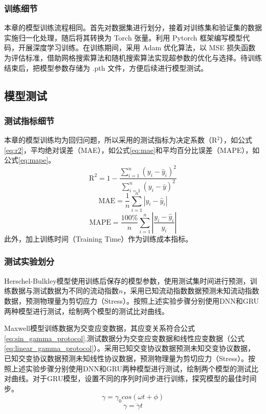 \subsubsection{训练细节}
本章的模型训练流程相同。首先对数据集进行划分，接着对训练集和验证集的数据实施归一化处理，随后将其转换为 Torch 张量。利用 Pytorch 框架编写模型代码，开展深度学习训练。在训练期间，采用 Adam 优化算法，以 MSE 损失函数为评估标准，借助网格搜索算法和随机搜索算法实现超参数的优化与选择。待训练结束后，把模型参数存储为 .pth 文件，方便后续进行模型测试。

\subsection{模型测试}
\subsubsection{测试指标细节}
本章的模型训练均为回归问题，所以采用的测试指标为决定系数（R$^2$），如公式\eqref{eq:r2}，平均绝对误差（MAE），如公式\eqref{eq:mae}和平均百分比误差（MAPE），如公式\eqref{eq:mape}。
\begin{equation}
  \text{R}^2 = 1 - \frac{\sum_{i=1}^{n} (y_i - \hat{y}_i)^2}{\sum_{i=1}^{n} (y_i - \bar{y})^2} \label{eq:r2}
\end{equation}
\begin{equation}
  \text{MAE} = \frac{1}{n} \sum_{i=1}^{n} |y_i - \hat{y}_i| \label{eq:mae}
\end{equation}
\begin{equation}
  \text{MAPE} = \frac{100\%}{n} \sum_{i=1}^{n} \left| \frac{y_i - \hat{y}_i}{y_i} \right| \label{eq:mape}
\end{equation}
此外，加上训练时间（Training Time）作为训练成本指标。

\subsubsection{测试实验划分}
Herschel-Bulkley模型使用训练后保存的模型参数，使用测试集时间进行预测，训练数据与测试数据为不同的流动指数$n$，采用已知流动指数数据预测未知流动指数数据，预测物理量为剪切应力（Stress）。按照上述实验步骤分别使用DNN和GRU两种模型进行测试，绘制两个模型的测试比对曲线。

Maxwell模型训练数据为交变应变数据，其应变关系符合公式\eqref{eq:sin_gamma_protocol},测试数据分为交变应变数据和线性应变数据（公式\eqref{eq:linear_gamma_protocol}）。采用已知交变协议数据预测未知交变协议数据，已知交变协议数据预测未知线性协议数据，预测物理量为剪切应力（Stress）。按照上述实验步骤分别使用DNN和GRU两种模型进行测试，绘制两个模型的测试比对曲线。对于GRU模型，设置不同的序列时间步进行训练，探究模型的最佳时间步。
\begin{equation}
  \gamma=\gamma_0cos(\omega t+\phi) \label{eq:sin_gamma_protocol}
\end{equation}
\begin{equation}
  \gamma=\dot{\gamma}t \label{eq:linear_gamma_protocol}
\end{equation}

